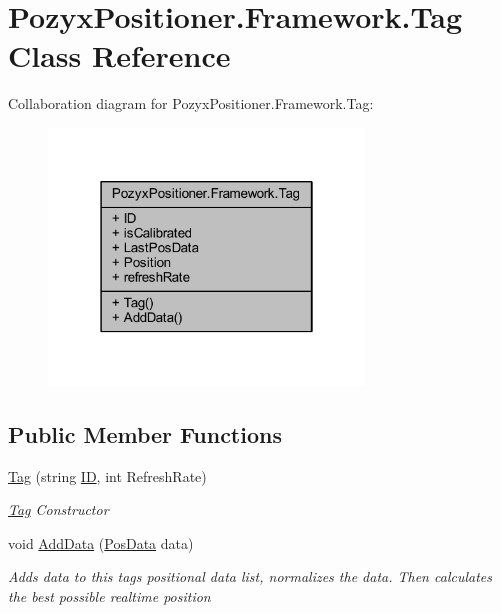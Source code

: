 \hypertarget{class_pozyx_positioner_1_1_framework_1_1_tag}{}\section{Pozyx\+Positioner.\+Framework.\+Tag Class Reference}
\label{class_pozyx_positioner_1_1_framework_1_1_tag}


Collaboration diagram for Pozyx\+Positioner.\+Framework.\+Tag\+:
\nopagebreak
\begin{figure}[H]
\begin{center}
\leavevmode
\includegraphics[width=238pt]{class_pozyx_positioner_1_1_framework_1_1_tag__coll__graph}
\end{center}
\end{figure}
\subsection*{Public Member Functions}
\begin{DoxyCompactItemize}
\item 
\hyperlink{class_pozyx_positioner_1_1_framework_1_1_tag_a9b58a1a5756bf3c8cda1e2afd32276b2}{Tag} (string \hyperlink{class_pozyx_positioner_1_1_framework_1_1_tag_a0d75eeca4dea7088e2b4a60230c13012}{ID}, int Refresh\+Rate)
\begin{DoxyCompactList}\small\item\em \hyperlink{class_pozyx_positioner_1_1_framework_1_1_tag}{Tag} Constructor \end{DoxyCompactList}\item 
void \hyperlink{class_pozyx_positioner_1_1_framework_1_1_tag_ac2741e137c420ad71f64ee2d3d5fefe8}{Add\+Data} (\hyperlink{struct_pozyx_positioner_1_1_framework_1_1_pos_data}{Pos\+Data} data)
\begin{DoxyCompactList}\small\item\em Adds data to this tag\textquotesingle{}s positional data list, normalizes the data. Then calculates the best possible realtime position \end{DoxyCompactList}\end{DoxyCompactItemize}
